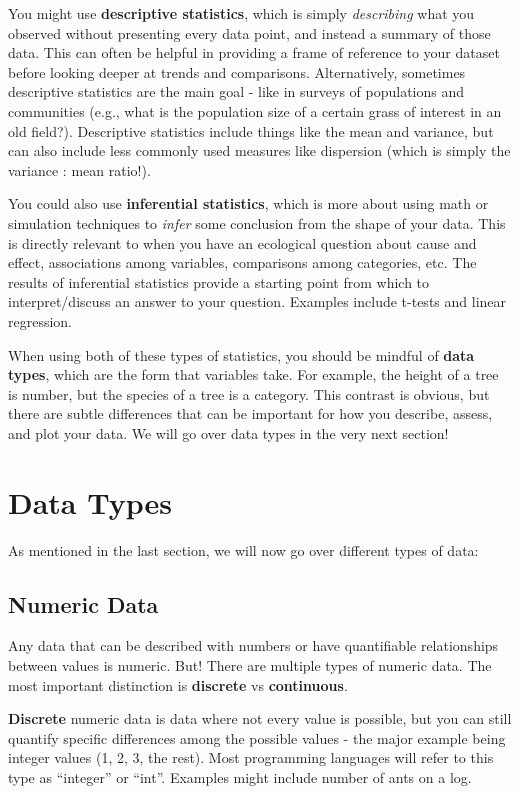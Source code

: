 \documentclass[
  letterpaper,
  DIV=11,
  numbers=noendperiod]{scrreprt}
\begin{document}
You might use \textbf{descriptive statistics}, which is simply
\emph{describing} what you observed without presenting every data point,
and instead a summary of those data. This can often be helpful in
providing a frame of reference to your dataset before looking deeper at
trends and comparisons. Alternatively, sometimes descriptive statistics
are the main goal - like in surveys of populations and communities
(e.g., what is the population size of a certain grass of interest in an
old field?). Descriptive statistics include things like the mean and
variance, but can also include less commonly used measures like
dispersion (which is simply the variance : mean ratio!).

You could also use \textbf{inferential statistics}, which is more about
using math or simulation techniques to \emph{infer} some conclusion from
the shape of your data. This is directly relevant to when you have an
ecological question about cause and effect, associations among
variables, comparisons among categories, etc. The results of inferential
statistics provide a starting point from which to interpret/discuss an
answer to your question. Examples include t-tests and linear regression.

When using both of these types of statistics, you should be mindful of
\textbf{data types}, which are the form that variables take. For
example, the height of a tree is number, but the species of a tree is a
category. This contrast is obvious, but there are subtle differences
that can be important for how you describe, assess, and plot your data.
We will go over data types in the very next section!

\chapter{Data Types}\label{data-types}

As mentioned in the last section, we will now go over different types of
data:

\section{Numeric Data}\label{numeric-data}

Any data that can be described with numbers or have quantifiable
relationships between values is numeric. But! There are multiple types
of numeric data. The most important distinction is \textbf{discrete} vs
\textbf{continuous}.

\textbf{Discrete} numeric data is data where not every value is
possible, but you can still quantify specific differences among the
possible values - the major example being integer values (1, 2, 3, the
rest). Most programming languages will refer to this type as ``integer''
or ``int''. Examples might include number of ants on a log.
\end{document}
